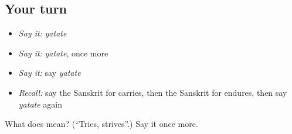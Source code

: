 \subsection*{Your turn}
\begin{itemize}
\raggedright
  \item \emph{Say it:} \emph{yatate}
  \item \emph{Say it:} \emph{yatate}, once more
  \item \emph{Say it:} say \emph{yatate}
  \item \emph{Recall:} say the Sanskrit for carries, then the Sanskrit for endures, then say \emph{yatate} again
\end{itemize}

\begin{tcolorbox}[breakable,colback=teal!4,colframe=teal!35!black,title={Before you move on}]
What does  mean? (\textquotedblleft{}Tries, strives\textquotedblright{}.) Say it once more.
\end{tcolorbox}
